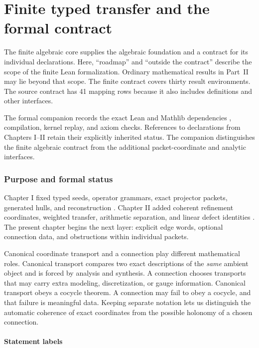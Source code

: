 \part{Finite typed transfer and the formal contract}\label{part:finite}
\noindent The finite algebraic core supplies the algebraic foundation and a contract for its individual declarations. Here, ``roadmap'' and ``outside the contract'' describe the scope of the finite Lean formalization. Ordinary mathematical results in Part~II may lie beyond that scope. The finite contract covers thirty result environments. The source contract has 41 mapping rows because it also includes definitions and other interfaces.

\medskip\noindent The formal companion records the exact Lean and Mathlib dependencies \cite{lean,mathlib}, compilation, kernel replay, and axiom checks. References to declarations from Chapters I--II retain their explicitly inherited status. The companion distinguishes the finite algebraic contract from the additional packet-coordinate and analytic interfaces.
\section{Purpose and formal status}
\label{sec:purpose}

Chapter I fixed typed seeds, operator grammars, exact projector packets,
generated hulls, and reconstruction \cite{paperI}.  Chapter II added coherent
refinement coordinates, weighted transfer, arithmetic separation, and linear
defect identities \cite{paperII}.  The present chapter begins the next layer:
explicit edge words, optional connection data, and obstructions within
individual packets.

Canonical coordinate transport and a connection play different mathematical
roles. Canonical transport compares two exact descriptions of the
\emph{same} ambient object and is forced by analysis and synthesis. A
connection chooses transports that may carry extra modeling, discretization,
or gauge information. Canonical transport obeys a cocycle theorem. A
connection may fail to obey a cocycle, and that failure is meaningful data.
Keeping separate notation lets us distinguish the automatic coherence of
exact coordinates from the possible holonomy of a chosen connection.

\subsection{Statement labels}

